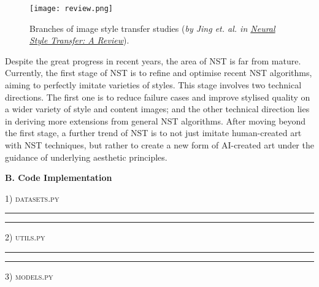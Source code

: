 \documentclass[a4paper]{article}
\newcommand{\HRule}{\rule{\linewidth}{0.5mm}}
\begin{document}
\vspace{4mm}
\begin{figure}[H]
\centering
\texttt{[image: review.png]}
\caption{Branches of image style transfer studies (\textit{by Jing et. al. in \href{https://arxiv.org/pdf/1705.04058.pdf}{Neural Style Transfer: A Review}}).}
\label{review}
\end{figure}

Despite the great progress in recent years, the area of NST is far from mature. Currently, the first stage of NST is to refine and optimise recent NST algorithms, aiming to perfectly imitate varieties of styles. This stage involves two technical directions. The first one is to reduce failure cases and improve stylised quality on a wider variety of style and content images; and the other technical direction lies in deriving more extensions from general NST algorithms. After moving beyond the first stage, a further trend of NST is to not just imitate human-created art with NST techniques, but rather to create a new form of AI-created art under the guidance of underlying aesthetic principles.


\clearpage
\begin{center}
\large\textbf{B. Code Implementation} \\
\end{center}


\vspace{2mm}
\large{}
\vspace{.5cm}

\noindent \LARGE \textsc{1) datasets.py} \small

\noindent \HRule



\noindent \HRule

\vspace{1cm}

\noindent \LARGE \textsc{2) utils.py} \small

\noindent \HRule



\noindent \HRule

\vspace{1cm}

\noindent \LARGE \textsc{3) models.py} \small
\end{document}
